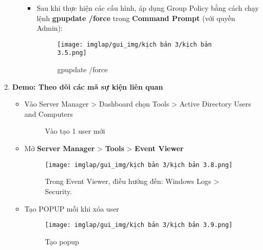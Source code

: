 \documentclass[13pt]{article}
\begin{document}
\begin{enumerate}
\begin{itemize}
\begin{itemize}
\begin{figure}[H]
                                \end{figure}
\newpage
                        \item Sau khi thực hiện các cấu hình, áp dụng Group Policy bằng cách chạy lệnh \textbf{gpupdate /force} trong \textbf{Command Prompt} (với quyền Admin): 
\begin{figure}[H]
                                \centering
                    \texttt{[image: imglap/gui\_img/kịch bản 3/kịch bản 3.5.png]}
            \caption{gpupdate /force}
            \label{fig:enter-label}
            \end{figure}
            \end{itemize}
            \end{itemize}
            \item \textbf{Demo: Theo dõi các mã sự kiện liên quan}
            \begin{itemize}
                    \begin{itemize}
                    \item Vào Server Manager > Dashboard chọn Tools > Active Directory Users and Computers
                    \begin{figure}[H]
 		\hfill
 		\hfill
 				\caption{Vào tạo 1 user mới}
 				\label{fig:AD_p2}
 		\end{figure}
\newpage
        \item Mở \textbf{Server Manager} > \textbf{Tools} > \textbf{Event Viewer}
\begin{figure}[H]
                    \centering
                    \texttt{[image: imglap/gui\_img/kịch bản 3/kịch bản 3.8.png]}
                    \caption{Trong Event Viewer, điều hướng đến: Windows Logs > Security. }
                    \label{fig:enter-label}
                \end{figure}
                \item Tạo POPUP mỗi khi xóa user 
\begin{figure}[H]
                                    \centering
                                    \texttt{[image: imglap/gui\_img/kịch bản 3/kịch bản 3.9.png]}
                                    \caption{Tạo popup}
                                    \label{fig:enter-label}
                                \end{figure}

\end{itemize}
\end{itemize}
\end{enumerate}
\end{document}
